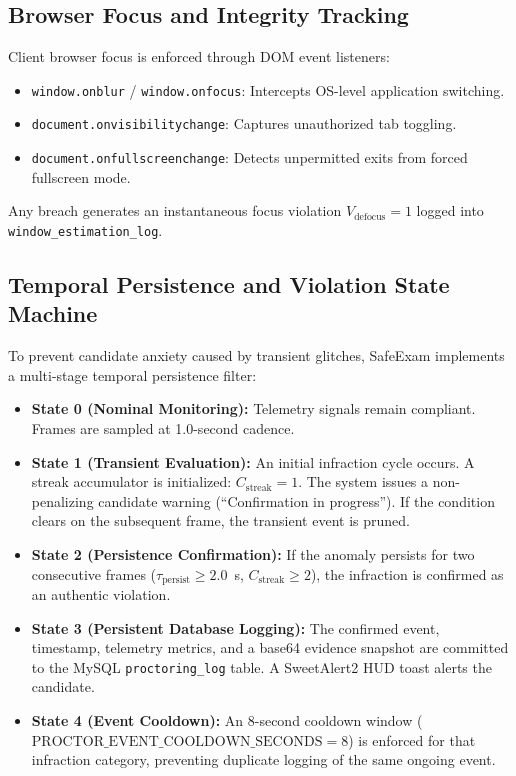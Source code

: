 \documentclass[conference]{IEEEtran}
\begin{document}
\subsection{Browser Focus and Integrity Tracking}
Client browser focus is enforced through DOM event listeners:
\begin{itemize}
    \item \texttt{window.onblur} / \texttt{window.onfocus}: Intercepts OS-level application switching.
    \item \texttt{document.onvisibilitychange}: Captures unauthorized tab toggling.
    \item \texttt{document.onfullscreenchange}: Detects unpermitted exits from forced fullscreen mode.
\end{itemize}
Any breach generates an instantaneous focus violation $V_{\text{defocus}} = 1$ logged into \texttt{window\_estimation\_log}.

\subsection{Temporal Persistence and Violation State Machine}
To prevent candidate anxiety caused by transient glitches, SafeExam implements a multi-stage temporal persistence filter:
\begin{itemize}
    \item \textbf{State 0 (Nominal Monitoring):} Telemetry signals remain compliant. Frames are sampled at 1.0-second cadence.
    \item \textbf{State 1 (Transient Evaluation):} An initial infraction cycle occurs. A streak accumulator is initialized: $C_{\text{streak}} = 1$. The system issues a non-penalizing candidate warning (``Confirmation in progress''). If the condition clears on the subsequent frame, the transient event is pruned.
    \item \textbf{State 2 (Persistence Confirmation):} If the anomaly persists for two consecutive frames ($\tau_{\text{persist}} \ge 2.0$~s, $C_{\text{streak}} \ge 2$), the infraction is confirmed as an authentic violation.
    \item \textbf{State 3 (Persistent Database Logging):} The confirmed event, timestamp, telemetry metrics, and a base64 evidence snapshot are committed to the MySQL \texttt{proctoring\_log} table. A SweetAlert2 HUD toast alerts the candidate.
    \item \textbf{State 4 (Event Cooldown):} An 8-second cooldown window ($\text{PROCTOR\_EVENT\_COOLDOWN\_SECONDS} = 8$) is enforced for that infraction category, preventing duplicate logging of the same ongoing event.
\end{itemize}
\end{document}
